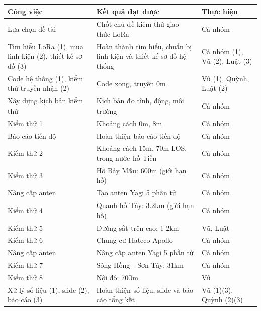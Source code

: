 \documentclass{article}
\begin{document}
	\begin{table}[H]
		\centering
		\renewcommand{\arraystretch}{1.2}
		\begin{tabular}{|p{5.25cm}|p{6.75cm}|p{3cm}|}
			\hline
			\textbf{Công việc} & \textbf{Kết quả đạt được} & \textbf{Thực hiện} \\ \hline
			
			Lựa chọn đề tài & Chốt chủ đề kiểm thử giao thức LoRa & Cả nhóm \\ \hline
			
			Tìm hiểu LoRa (1), mua linh kiện (2), thiết kế sơ đồ (3) 
			& Hoàn thành tìm hiểu, chuẩn bị linh kiện và thiết kế sơ đồ hệ thống 
			& Cả nhóm (1), Vũ (2), Luật (3) \\ \hline
			
			Code hệ thống (1), kiểm thử truyền nhận (2) 
			& Code xong, truyền 0m 
			& Vũ (1), Quỳnh, Luật (2) \\ \hline
			
			Xây dựng kịch bản kiểm thử 
			& Kịch bản đo tĩnh, động, môi trường 
			& Cả nhóm \\ \hline
			
			Kiểm thử 1 
			& Khoảng cách 0m, 8m
			& Cả nhóm \\ \hline
			
			Báo cáo tiến độ
			& Hoàn thiện báo cáo tiến độ
			& Cả nhóm \\ \hline
			
			Kiểm thử 2 
			& Khoảng cách 15m, 70m LOS, trong nước hồ Tiền 
			& Cả nhóm \\ \hline
			
			Kiểm thử 3 
			& Hồ Bảy Mẫu: 600m (giới hạn hồ) 
			& Cả nhóm \\ \hline
			
			Nâng cấp anten 
			& Tạo anten Yagi 5 phần tử 
			& Cả nhóm \\ \hline
			
			Kiểm thử 4 
			& Quanh hồ Tây: 3.2km (giới hạn hồ) 
			& Cả nhóm \\ \hline
			
			Kiểm thử 5 
			& Đường sắt trên cao: 1-2km
			& Vũ, Luật \\ \hline
			
			Kiểm thử 6 
			& Chung cư Hateco Apollo
			& Cả nhóm \\ \hline
			
			Nâng cấp anten 
			& Nâng cấp anten Yagi 5 phần tử 
			& Cả nhóm \\ \hline
			
			Kiểm thử 7 
			& Sông Hồng - Sơn Tây: 31km
			& Cả nhóm \\ \hline
			
			Kiểm thử 8 
			& Nội đô: 700m
			& Vũ \\ \hline
			
			Xử lý số liệu (1), slide (2), báo cáo (3) 
			& Hoàn thiện số liệu, slide và báo cáo tổng kết 
			& Vũ (1)(3), Quỳnh (2)(3) \\ \hline
			
		\end{tabular}
	\end{table}
	
\end{document}

